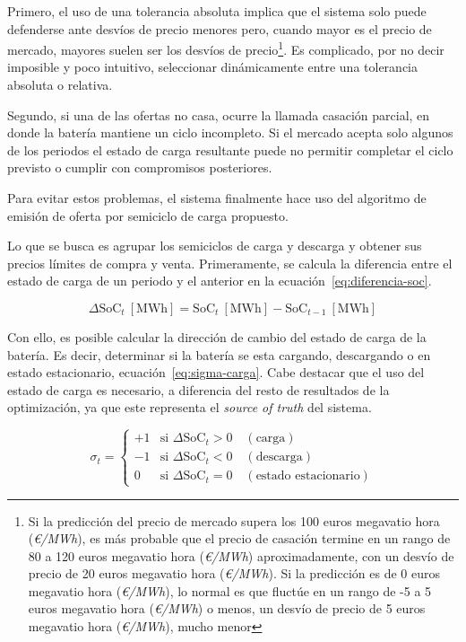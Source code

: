 \begin{equation}
\label{eq:emisión-tolerancia}
\end{equation}

Primero, el uso de una tolerancia absoluta implica que el sistema solo puede defenderse ante desvíos de precio menores pero, cuando mayor es el precio de mercado, mayores suelen ser los desvíos de precio\footnote{Si la predicción del precio de mercado supera los 100 euros megavatio hora (\textit{€/MWh}), es más probable que el precio de casación termine en un rango de 80 a 120 euros megavatio hora (\textit{€/MWh}) aproximadamente, con un desvío de precio de 20 euros megavatio hora (\textit{€/MWh}). Si la predicción es de 0 euros megavatio hora (\textit{€/MWh}), lo normal es que fluctúe en un rango de -5 a 5 euros megavatio hora (\textit{€/MWh}) o menos, un desvío de precio de 5 euros megavatio hora (\textit{€/MWh}), mucho menor}. Es complicado, por no decir imposible y poco intuitivo, seleccionar dinámicamente entre una tolerancia absoluta o relativa.

Segundo, si una de las ofertas no casa, ocurre la llamada casación parcial, en donde la batería mantiene un ciclo incompleto. Si el mercado acepta solo algunos de los periodos el estado de carga resultante puede no permitir completar el ciclo previsto o cumplir con compromisos posteriores.

Para evitar estos problemas, el sistema finalmente hace uso del algoritmo de emisión de oferta por semiciclo de carga propuesto.

Lo que se busca es agrupar los semiciclos de carga y descarga y obtener sus precios límites de compra y venta. Primeramente, se calcula la diferencia entre el estado de carga de un periodo y el anterior en la ecuación~\ref{eq:diferencia-soc}.

\begin{equation}
\label{eq:diferencia-soc}
\Delta \mathrm{SoC}_{t}~[\text{MWh}] = \mathrm{SoC}_{t}~[\text{MWh}] - \mathrm{SoC}_{t-1}~[\text{MWh}]
\end{equation}

Con ello, es posible calcular la dirección de cambio del estado de carga de la batería. Es decir, determinar si la batería se esta cargando, descargando o en estado estacionario, ecuación~\ref{eq:sigma-carga}. Cabe destacar que el uso del estado de carga es necesario, a diferencia del resto de resultados de la optimización, ya que este representa el \textit{source of truth} del sistema.

\begin{equation}
\label{eq:sigma-carga}
\sigma_{t} = \begin{cases}
+1 & \text{si } \Delta\mathrm{SoC}_{t} > 0 \quad (\text{carga}) \\
-1 & \text{si } \Delta\mathrm{SoC}_{t} < 0 \quad (\text{descarga}) \\
0  & \text{si } \Delta\mathrm{SoC}_{t} = 0 \quad (\text{estado estacionario})
\end{cases}
\end{equation}


